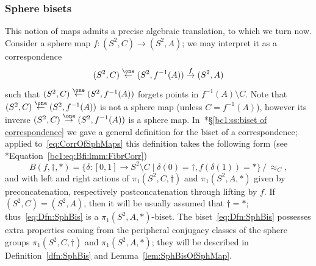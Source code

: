 \documentclass{amsart}
\begin{document}
\subsubsection{Sphere bisets}\label{ss:sphere bisets}
This notion of maps admits a precise algebraic translation, to which
we turn now. Consider a sphere map $f\colon (S^2,C)\to (S^2,A)$; we
may interpret it as a correspondence
\begin{equation}\label{eq:CorrOfSphMaps}
  (S^2,C)\overset{\one}\leftarrow (S^2,f^{-1}(A))\overset{f}{\rightarrow} (S^2,A)\end{equation}
such that $(S^2,C)\overset{\one}\leftarrow (S^2,f^{-1}(A))$ forgets
points in $f^{-1}(A)\setminus C$. Note that
$(S^2,C)\overset{\one}\leftarrow (S^2,f^{-1}(A))$ is not a sphere map
(unless $C=f^{-1}(A)$), however its inverse
$(S^2,C)\overset{\one}\rightarrow (S^2,f^{-1}(A))$ is a sphere
map. In~\cite{bartholdi-dudko:bc1}*{\S\ref{bc1:ss:biset of
    correspondence}} we gave a general definition for the biset of a
correspondence; applied to~\eqref{eq:CorrOfSphMaps} this definition
takes the following form (see
\cite{bartholdi-dudko:bc1}*{Equation~\eqref{bc1:eq:Bfi:lmm:FibrCorr}})
\begin{equation}\label{eq:Dfn:SphBis}
  B(f,\dagger,*)=\{\delta\colon[0,1]\to S^2\setminus C\mid\delta(0)=\dagger,f(\delta(1))=*\}\,/\,{\approx_C},
\end{equation}
and with left and right actions of $\pi_1(S^2,C,\dagger)$ and
$\pi_1(S^2,A,*)$ given by preconcatenation, respectively
postconcatenation through lifting by $f$. If $(S^2,C)=(S^2,A)$, then it will be usually assumed that $\dagger=*$; thus~\eqref{eq:Dfn:SphBis} is a $\pi_1(S^2,A,*)$-biset. The
biset~\eqref{eq:Dfn:SphBis} possesses extra properties coming from the
peripheral conjugacy classes of the sphere groups
$\pi_1(S^2,C,\dagger)$ and $\pi_1(S^2,A,*)$; they will be described in
Definition~\ref{dfn:SphBis} and Lemma~\ref{lem:SphBisOfSphMap}.
\end{document}
